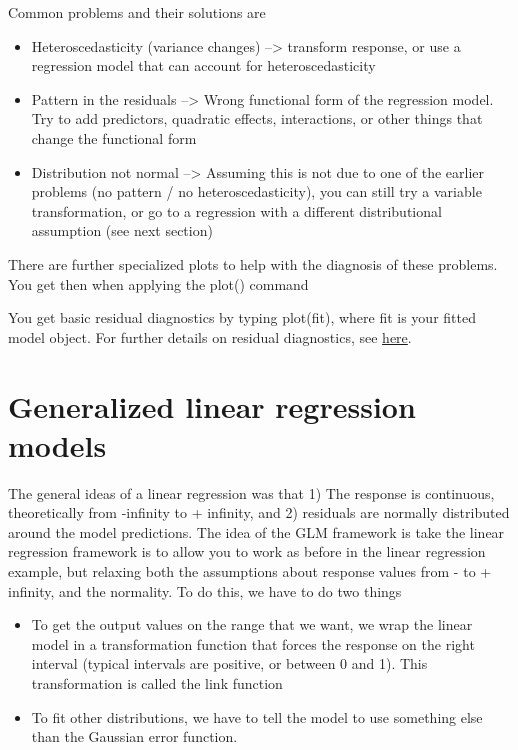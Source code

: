 \documentclass[a4paper,twoside]{tufte-book}\usepackage[]{graphicx}\usepackage[]{color}
\begin{document}
Common problems and their solutions are 

\begin{itemize}
  \item Heteroscedasticity (variance changes) --> transform response, or use a regression model that can account for heteroscedasticity
  \item Pattern in the residuals --> Wrong functional form of the regression model. Try to add predictors, quadratic effects, interactions, or other things that change the functional form
  \item Distribution not normal --> Assuming this is not due to one of the earlier problems (no pattern / no heteroscedasticity), you can still try a variable transformation, or go to a regression with a different distributional assumption (see next section)
\end{itemize}  

There are further specialized plots to help with the diagnosis of these problems. You get then when applying the plot() command 


You get basic residual diagnostics by typing plot(fit), where fit is your fitted model object. For further details on residual diagnostics, see \href{http://www.statmethods.net/stats/rdiagnostics.html}{here}.



\section{Generalized linear regression models}

The general ideas of a linear regression was that 1) The response is continuous, theoretically from -infinity to + infinity, and 2) residuals are normally distributed around the model predictions. The idea of the GLM framework is take the linear regression framework is to allow you to work as before in the linear regression example, but relaxing both the assumptions about response values from - to + infinity, and the normality. To do this, we have to do two things

\begin{itemize}
  \item To get the output values on the range that we want, we wrap the linear model in a transformation function that forces the response on the right interval (typical intervals are positive, or between 0 and 1). This transformation is called the link function
  \item To fit other distributions, we have to tell the model to use something else than the Gaussian error function. 
\end{itemize}    
   
\end{document}
